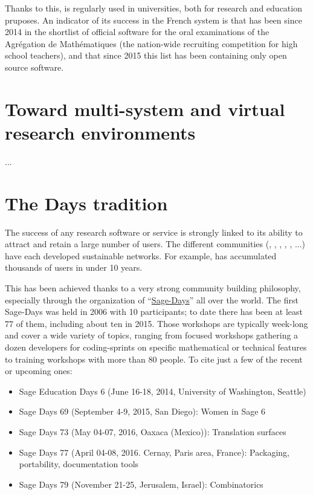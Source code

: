 \documentclass[12pt]{amsbook}
\begin{document}
Thanks to this, \Sage is regularly used in universities, both for
research and education pruposes.  An indicator of its success in the French
system is that \Sage has been since 2014 in the shortlist of official
software for the oral examinations of the Agrégation de Mathématiques
(the nation-wide recruiting competition for high school teachers), and
that since 2015 this list has been containing only open source software.

\section{Toward multi-system and virtual research environments}

...

\section{The \Sage Days tradition}

The success of any research software or service is strongly linked to
its ability to attract and retain a large number of users. The
different communities (\Sage, \GAP, \Pari, \Singular, \Jupyter, ...)
have each developed sustainable networks. For example, \Sage has
accumulated thousands of users in under 10 years.

This has been achieved thanks to a very strong community building
philosophy, especially through the organization of
“\href{https://wiki.sagemath.org/Workshops}{Sage-Days}” all over the
world. The first Sage-Days was held in 2006 with 10 participants; to
date there has been at least 77 of them, including about ten in
2015. Those workshops are typically week-long and cover a wide
variety of topics, ranging from focused workshops gathering a dozen
developers for coding-sprints on specific mathematical or technical
features to training workshops with more than 80 people. To cite just
a few of the recent or upcoming ones:

\begin{itemize}
\item Sage Education Days 6 (June 16-18, 2014, University of
  Washington, Seattle)
\item Sage Days 69 (September 4-9, 2015, San Diego): Women in Sage 6
\item Sage Days 73 (May 04-07, 2016, Oaxaca (Mexico)): Translation surfaces
\item Sage Days 77 (April 04-08, 2016. Cernay, Paris area, France):
  Packaging, portability, documentation tools
\item Sage Days 79 (November 21-25, Jerusalem, Israel): Combinatorics
\end{itemize}
\end{document}
